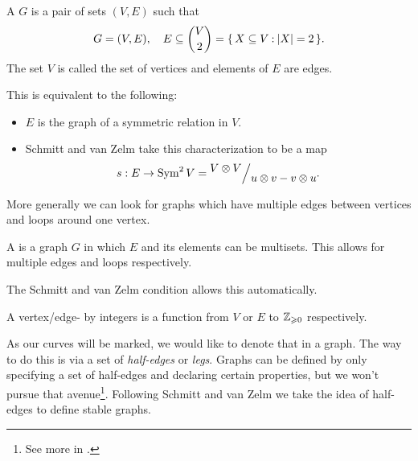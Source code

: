 \documentclass[12pt]{memoir}
\begin{document}
\begin{Def}
    A  $G$ is a pair of sets $(V,E)$ such that  
    $$G=(V,E),\quad E\subseteq\binom{V}{2}=\{\,X\subseteq V\mathbin{:}\lvert X\rvert=2\,\}.$$
    The set $V$ is called the set of vertices and elements of $E$ are edges.
\end{Def}
This is equivalent to the following:
\begin{itemize}
    \item $E$ is the graph of a symmetric relation in $V$.
    \item  Schmitt and van Zelm take this characterization to be a map 
$$s:E\to\Sym^2 V=\quot{V\ox V}{u\ox v-v\ox u}.$$
\end{itemize} 

More generally we can look for graphs which have multiple edges between vertices and loops around one vertex.

\begin{Def}
A  is a graph $G$ in which $E$ and its elements can be multisets. This allows for multiple edges and loops respectively.    
\end{Def}

The Schmitt and van Zelm condition allows this automatically.

\begin{Def}
    A vertex/edge- by integers is a function from $V$ or $E$ to $\mathbb{Z}_{\geqslant 0}$ respectively. 
\end{Def}

As our curves will be marked, we would like to denote that in a graph. The way to do this is via a set of \emph{half-edges} or \emph{legs}. Graphs can be defined by only specifying a set of half-edges and declaring certain properties, but we won't pursue that avenue\footnote{See more in \href{https://math.stackexchange.com/q/2678435}{}.}. Following Schmitt and van Zelm we take the idea of half-edges to define stable graphs.
\end{document}
